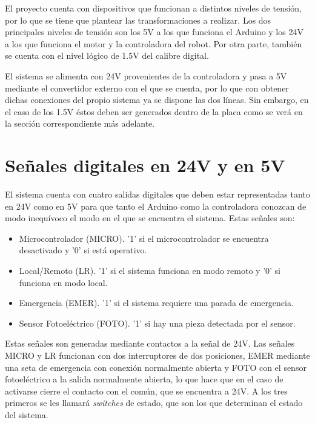 El proyecto cuenta con dispositivos que funcionan a distintos niveles de tensión, por 
lo que se tiene que plantear las transformaciones a realizar. Los dos principales niveles de tensión 
son los 5V a los que funciona el Arduino y los 24V a los que funciona el motor y la controladora del 
robot. Por otra parte, también se cuenta con el nivel lógico de 1.5V del calibre digital.

El sistema se alimenta con 24V provenientes de la controladora y pasa a 5V mediante el convertidor
externo con el que se cuenta, por lo que con obtener dichas conexiones del propio sistema ya se dispone
las dos líneas. Sin embargo, en el caso de los 1.5V éstos deben ser generados dentro de la placa como
se verá en la sección correspondiente más adelante.

\section{Señales digitales en 24V y en 5V}

El sistema cuenta con cuatro salidas digitales que deben estar representadas tanto en 24V como en 5V
para que tanto el Arduino como la controladora conozcan de modo inequívoco el modo en el que se encuentra
el sistema. Estas señales son:
\begin{itemize}
    \item Microcontrolador (MICRO). '1' si el microcontrolador se encuentra desactivado y '0' si está operativo.
    \item Local/Remoto (LR). '1' si el sistema funciona en modo remoto y '0' si funciona en modo local.
    \item Emergencia (EMER). '1' si el sistema requiere una parada de emergencia.
    \item Sensor Fotoeléctrico (FOTO). '1' si hay una pieza detectada por el sensor.
\end{itemize}

Estas señales son generadas mediante contactos a la señal de 24V. Las señales MICRO y LR funcionan con dos
interruptores de dos posiciones, EMER mediante una seta de emergencia con conexión normalmente abierta y
FOTO con el sensor fotoeléctrico a la salida normalmente abierta, lo que hace que en el caso de activarse
cierre el contacto con el común, que se encuentra a 24V. A los tres primeros se les llamará \emph{switches} de estado,
que son los que determinan el estado del sistema.


